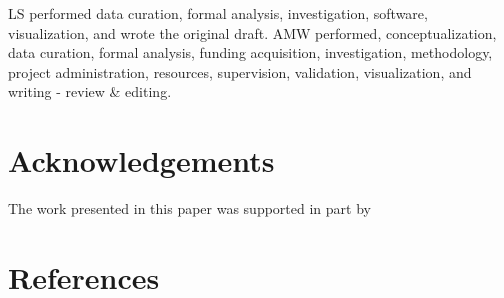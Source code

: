 \documentclass[
true
]{sn-jnl}
\begin{document}
LS performed data curation, formal analysis, investigation, software,
visualization, and wrote the original draft. AMW performed,
conceptualization, data curation, formal analysis, funding acquisition,
investigation, methodology, project administration, resources,
supervision, validation, visualization, and writing - review \& editing.

\section*{Acknowledgements}\label{acknowledgements}

The work presented in this paper was supported in part by

\section*{References}\label{references}

\renewcommand{\bibsection}{}

\end{document}
